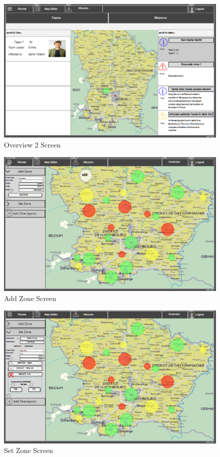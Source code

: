 \begin{figure}[htbp]
\begin{center}
 \caption{\label{fig:W7} Overview 2 Screen}
   \includegraphics[width=150mm]{./images/Web/coverview3.eps}
\end{center}
\end{figure}
\begin{figure}[htbp]
\begin{center}
 \caption{\label{fig:W10} Add Zone Screen}
   \includegraphics[width=150mm]{./images/Web/addzone.eps}
\end{center}
\end{figure}
\begin{figure}[htbp]
\begin{center}
 \caption{\label{fig:W11} Set Zone Screen}
   \includegraphics[width=150mm]{./images/Web/setzone.eps}
\end{center}
\end{figure}

